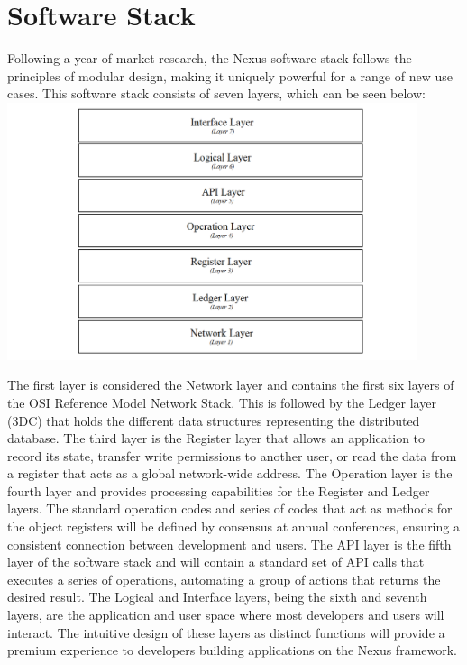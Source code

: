 \documentclass[11pt]{article}
\begin{document}
\section{Software Stack}

Following a year of market research, the Nexus software stack follows the principles of modular design, making it uniquely powerful for a range of new use cases. This software stack consists of seven layers, which can be seen below:\\


\hspace{-33pt}
\includegraphics[width=0.9\textwidth]{./images/rsz_stack.png}

\noindent The first layer is considered the Network layer and contains the first six layers of the OSI Reference Model Network Stack.
This is followed by the Ledger layer (3DC) that holds the different data structures representing the distributed database.
The third layer is the Register layer that allows an application to record its state, transfer write permissions to another user, or read the data from a register that acts as a global network-wide address.
The Operation layer is the fourth layer and provides processing capabilities for the Register and Ledger layers.
The standard operation codes and series of codes that act as methods for the object registers will be defined by consensus at annual conferences, ensuring a consistent connection between development and users.
The API layer is the fifth layer of the software stack and will contain a standard set of API calls that executes a series of operations, automating a group of actions that returns the desired result.
The Logical and Interface layers, being the sixth and seventh layers, are the application and user space where most developers and users will interact.
The intuitive design of these layers as distinct functions will provide a premium experience to developers building applications on the Nexus framework.
\end{document}
